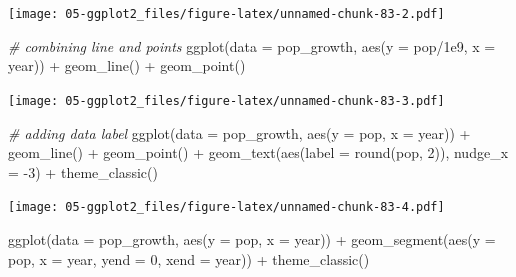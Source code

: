 \documentclass[
]{book}
\newenvironment{Shaded}{\begin{snugshade}}{\end{snugshade}}
\newcommand{\AttributeTok}[1]{\textcolor[rgb]{0.77,0.63,0.00}{#1}}
\newcommand{\CommentTok}[1]{\textcolor[rgb]{0.56,0.35,0.01}{\textit{#1}}}
\newcommand{\DecValTok}[1]{\textcolor[rgb]{0.00,0.00,0.81}{#1}}
\newcommand{\FloatTok}[1]{\textcolor[rgb]{0.00,0.00,0.81}{#1}}
\newcommand{\FunctionTok}[1]{\textcolor[rgb]{0.00,0.00,0.00}{#1}}
\newcommand{\NormalTok}[1]{#1}
\newcommand{\SpecialCharTok}[1]{\textcolor[rgb]{0.00,0.00,0.00}{#1}}
\begin{document}
\texttt{[image: 05-ggplot2\_files/figure-latex/unnamed-chunk-83-2.pdf]}

\begin{Shaded}
\begin{Highlighting}[]


\CommentTok{\# combining line and points}
\FunctionTok{ggplot}\NormalTok{(}\AttributeTok{data =}\NormalTok{ pop\_growth, }\FunctionTok{aes}\NormalTok{(}\AttributeTok{y =}\NormalTok{ pop}\SpecialCharTok{/}\FloatTok{1e9}\NormalTok{, }\AttributeTok{x =}\NormalTok{ year)) }\SpecialCharTok{+} 
  \FunctionTok{geom\_line}\NormalTok{() }\SpecialCharTok{+} 
  \FunctionTok{geom\_point}\NormalTok{()}
\end{Highlighting}
\end{Shaded}

\texttt{[image: 05-ggplot2\_files/figure-latex/unnamed-chunk-83-3.pdf]}

\begin{Shaded}
\begin{Highlighting}[]


\CommentTok{\# adding data label}
\FunctionTok{ggplot}\NormalTok{(}\AttributeTok{data =}\NormalTok{ pop\_growth, }\FunctionTok{aes}\NormalTok{(}\AttributeTok{y =}\NormalTok{ pop, }\AttributeTok{x =}\NormalTok{ year)) }\SpecialCharTok{+} 
  \FunctionTok{geom\_line}\NormalTok{() }\SpecialCharTok{+} 
  \FunctionTok{geom\_point}\NormalTok{() }\SpecialCharTok{+}
  \FunctionTok{geom\_text}\NormalTok{(}\FunctionTok{aes}\NormalTok{(}\AttributeTok{label =} \FunctionTok{round}\NormalTok{(pop, }\DecValTok{2}\NormalTok{)), }\AttributeTok{nudge\_x =} \SpecialCharTok{{-}}\DecValTok{3}\NormalTok{) }\SpecialCharTok{+}
  \FunctionTok{theme\_classic}\NormalTok{()}
\end{Highlighting}
\end{Shaded}

\texttt{[image: 05-ggplot2\_files/figure-latex/unnamed-chunk-83-4.pdf]}

\begin{Shaded}
\begin{Highlighting}[]


\FunctionTok{ggplot}\NormalTok{(}\AttributeTok{data =}\NormalTok{ pop\_growth, }\FunctionTok{aes}\NormalTok{(}\AttributeTok{y =}\NormalTok{ pop, }\AttributeTok{x =}\NormalTok{ year)) }\SpecialCharTok{+} 
  \FunctionTok{geom\_segment}\NormalTok{(}\FunctionTok{aes}\NormalTok{(}\AttributeTok{y =}\NormalTok{ pop, }\AttributeTok{x =}\NormalTok{ year, }\AttributeTok{yend =} \DecValTok{0}\NormalTok{, }\AttributeTok{xend =}\NormalTok{ year)) }\SpecialCharTok{+}
  \FunctionTok{theme\_classic}\NormalTok{()}
\end{Highlighting}
\end{Shaded}
\end{document}
